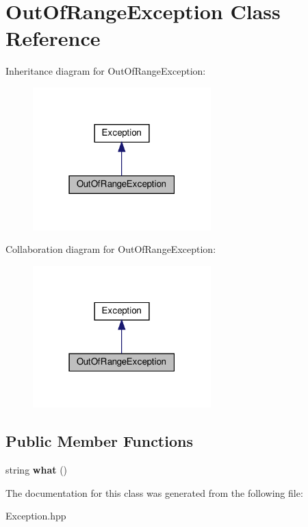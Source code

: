 \hypertarget{classOutOfRangeException}{}\section{Out\+Of\+Range\+Exception Class Reference}
\label{classOutOfRangeException}


Inheritance diagram for Out\+Of\+Range\+Exception\+:
\nopagebreak
\begin{figure}[H]
\begin{center}
\leavevmode
\includegraphics[width=195pt]{classOutOfRangeException__inherit__graph}
\end{center}
\end{figure}


Collaboration diagram for Out\+Of\+Range\+Exception\+:
\nopagebreak
\begin{figure}[H]
\begin{center}
\leavevmode
\includegraphics[width=195pt]{classOutOfRangeException__coll__graph}
\end{center}
\end{figure}
\subsection*{Public Member Functions}
\begin{DoxyCompactItemize}
\item 
\mbox{\label{classOutOfRangeException_a1154ecb3ad64bd2f044d834ccc8d63ea}} 
string {\bfseries what} ()
\end{DoxyCompactItemize}


The documentation for this class was generated from the following file\+:\begin{DoxyCompactItemize}
\item 
Exception.\+hpp\end{DoxyCompactItemize}
